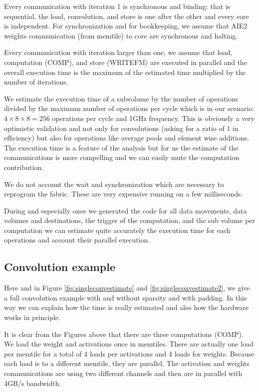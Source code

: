 \documentclass[sigconf]{acmart}
\begin{document}
Every communication with iteration 1 is synchronous and binding: that
is sequential, the load, convolution, and store is one after the other
and every core is independent.  For synchronization and for
bookkeeping, we assume that AIE2 weights communication (from memtile)
to core are synchronous and halting.

Every communication with iteration larger than one, we assume that
load, computation (COMP), and store (WRITEFM) are executed in parallel
and the overall execution time is the maximum of the estimated time
multiplied by the number of iterations.

We estimate the execution time of a subvolume by the number of
operations divided by the maximum number of operations per cycle which
is in our scenario: $4\times 8 \times 8 = 256 $ operations per cycle
and 1GHz frequency. This is obviously a very optimistic validation and
not only for convolutions (asking for a ratio of 1 in efficiency) but
also for operations like average pools and element wise additions. The
execution time is a feature of the analysis but for us the estimate of
the communications is more compelling and we can easily mute the
computation contribution.

We do not account the wait and synchronization which are necessary to reprogram
the fabric. These are very expensive running on a few milliseconds.

During and especially once we generated the code for all data
movements, data volumes and destinations, the trigger of the
computation, and the sub volume per computation we can estimate quite
accurately the execution time for each operations and account their
parallel execution.

\subsection{Convolution example}
Here and in Figure \ref{fig:singleconvestimate} and
\ref{fig:singleconvestimate2}, we give a full convolution example with
and without sparsity and with padding. In this way we can explain how
the time is really estimated and also how the hardware works in
principle.

It is clear from the Figures above that there are three computations
(COMP). We load the weight and activations once in memtiles. There are
actually one load per memtile for a total of 4 loads per activations
and 4 loads for weights. Because each load is to a different
memtile, they are parallel.  The activation and weights communications
are using two different channels and then are in parallel with 4GB/s
bandwidth.
\end{document}

